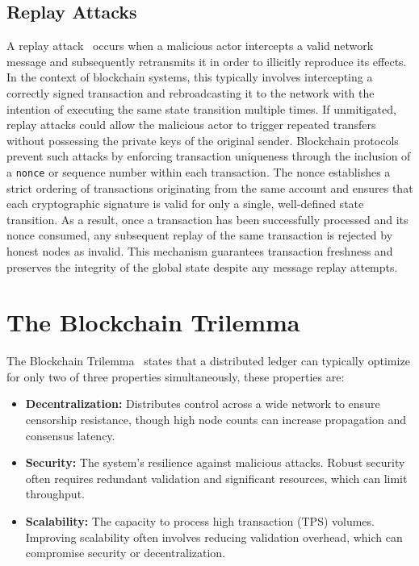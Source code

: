 \subsection{Replay Attacks}
A replay attack~\cite{replayAttack} occurs when a malicious actor intercepts a valid network message and subsequently retransmits it in order to illicitly reproduce its effects. In the context of blockchain systems, this typically involves intercepting a correctly signed transaction and rebroadcasting it to the network with the intention of executing the same state transition multiple times. If unmitigated, replay attacks could allow the malicious actor to trigger repeated transfers without possessing the private keys of the original sender. Blockchain protocols prevent such attacks by enforcing transaction uniqueness through the inclusion of a \texttt{nonce} or sequence number within each transaction. The nonce establishes a strict ordering of transactions originating from the same account and ensures that each cryptographic signature is valid for only a single, well-defined state transition. As a result, once a transaction has been successfully processed and its nonce consumed, any subsequent replay of the same transaction is rejected by honest nodes as invalid. This mechanism guarantees transaction freshness and preserves the integrity of the global state despite any message replay attempts.


\section{The Blockchain Trilemma} \label{ch2_trilemma}

The Blockchain Trilemma~\cite{blockchainTrilemma} states that a distributed ledger can typically optimize for only two of three properties simultaneously, these properties are:

\begin{itemize}
    \item \textbf{Decentralization:} Distributes control across a wide network to ensure censorship resistance, though high node counts can increase propagation and consensus latency.
    \item \textbf{Security:} The system's resilience against malicious attacks. Robust security often requires redundant validation and significant resources, which can limit throughput.
    \item \textbf{Scalability:} The capacity to process high transaction (TPS) volumes. Improving scalability often involves reducing validation overhead, which can compromise security or decentralization.
\end{itemize}

